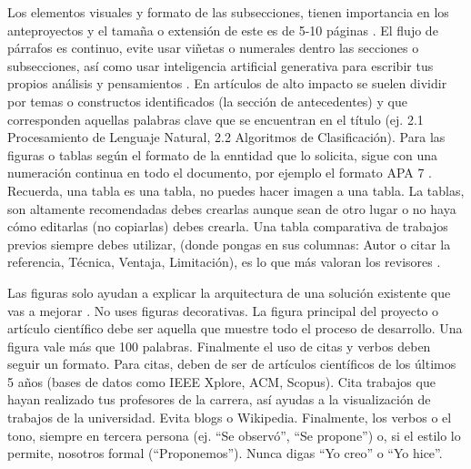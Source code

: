 \documentclass[12pt]{article}
\begin{document}
Los elementos visuales y formato de las subsecciones, tienen importancia en los anteproyectos y el tamaña o extensión de este es de 5-10 páginas \parencite{10.1007/978-3-031-98890-5_3}. El flujo de párrafos es continuo, evite usar viñetas o numerales dentro las secciones o subsecciones, así como usar inteligencia artificial generativa para escribir tus propios análisis y pensamientos \parencite{Ayala-Carabajo2026,guerrero2025integracion}. En artículos de alto impacto se suelen dividir por temas o constructos identificados (la sección de antecedentes) y que corresponden aquellas palabras clave que se encuentran en el título (ej. 2.1 Procesamiento de Lenguaje Natural, 2.2 Algoritmos de Clasificación).
Para las figuras o tablas según el formato de la enntidad que lo solicita, sigue con una numeración continua en todo el documento, por ejemplo el formato APA 7 \parencite{JacomeMarmol2025,guerrero2025integracion}. Recuerda, una tabla es una tabla, no puedes hacer imagen a una tabla. La tablas, son altamente recomendadas debes crearlas aunque sean de otro lugar o no haya cómo editarlas (no copiarlas) debes crearla. Una tabla comparativa de trabajos previos siempre debes utilizar, (donde pongas en sus columnas: Autor o citar la referencia, Técnica, Ventaja, Limitación), es lo que más valoran los revisores \parencite{10.1007/978-3-031-70760-5_37}.

Las figuras solo ayudan a explicar la arquitectura de una solución existente que vas a mejorar \parencite{Lopez-Chila2025}. No uses figuras decorativas. La figura principal del proyecto o artículo científico debe ser aquella que muestre todo el proceso de desarrollo. Una figura vale más que 100 palabras.
Finalmente el uso de citas y verbos deben seguir un formato. Para citas, deben de ser de artículos científicos de los últimos 5 años (bases de datos como IEEE Xplore, ACM, Scopus). Cita trabajos que hayan realizado tus profesores de la carrera, así ayudas a la visualización de trabajos de la universidad. Evita blogs o Wikipedia. Finalmente, los verbos o el tono, siempre en tercera persona (ej. ``Se observó'', ``Se propone'') o, si el estilo lo permite, nosotros formal (``Proponemos''). Nunca digas ``Yo creo'' o ``Yo hice''.
\end{document}
